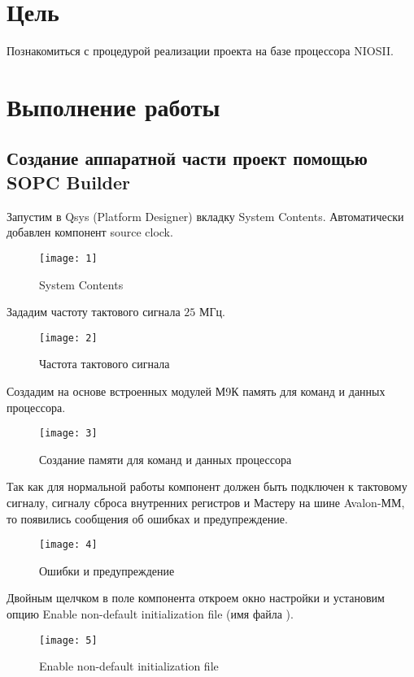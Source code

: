 





\tableofcontents
\lstlistoflistings
\listoffigures
\newpage

\section{Цель}

\noindent Познакомиться с процедурой реализации проекта на базе процессора NIOSII.

\section{Выполнение работы}

\subsection{Создание аппаратной части проект помощью SOPC Builder}

Запустим в Qsys (Platform Designer) вкладку System Contents. Автоматически добавлен компонент source clock. 
\begin{figure}[H]
	\centering
	\texttt{[image: 1]}
	\caption{System Contents}
\end{figure}

Зададим частоту тактового сигнала $25$ МГц.
\begin{figure}[H]
	\centering
	\texttt{[image: 2]}
	\caption{Частота тактового сигнала}
\end{figure}

Создадим на основе встроенных модулей М9К память для команд и данных процессора.
\begin{figure}[H]
	\centering
	\texttt{[image: 3]}
	\caption{Создание памяти для команд и данных процессора}
\end{figure}

Так как для нормальной работы компонент должен быть подключен к тактовому сигналу, сигналу сброса внутренних регистров и Мастеру на шине Avalon-ММ, то появились сообщения об ошибках и предупреждение.
\begin{figure}[H]
	\centering
	\texttt{[image: 4]}
	\caption{Ошибки и предупреждение}
\end{figure}

Двойным щелчком в поле компонента откроем окно настройки и установим опцию Enable non-default initialization file (имя файла ).
\begin{figure}[H]
	\centering
	\texttt{[image: 5]}
	\caption{Enable non-default initialization file}
\end{figure}

